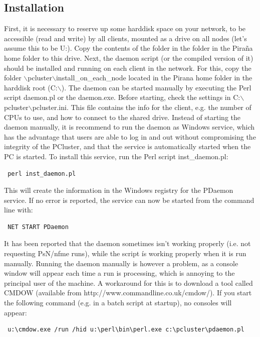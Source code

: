 \documentclass[a4,11pt]{report} \usepackage[pdftex]{graphicx}
\begin{document}
{{\subsection{Installation} First, it is necessary to reserve up some
harddisk space on your network, to be accessible (read and write) by
all clients, mounted as a drive on all nodes (let's assume this to be
U:). Copy the contents of the folder
 \normalfont in the
 \normalfont folder in the Pira\~na home folder to
this drive. Next, the daemon script (or the compiled version of it) should be
installed and running on each client in the network. For this, copy
the folder $\backslash$pcluster$\backslash$install\_on\_each\_node located in the Pirana home folder in the
harddisk root (C:$\backslash$). The daemon can be started manually by
executing the Perl script daemon.pl or the daemon.exe.  Before
starting, check the settings in
C:$\backslash$pcluster$\backslash$pcluster.ini. This file contains the
info for the client, e.g. the number of CPUs to use, and how to
connect to the shared drive.  Instead of starting the daemon manually, it is recommend to run the daemon as Windows service, which has the advantage that users are able to log in and out without compromising the integrity of the PCluster, and that
the service is automatically started when the PC is started. To
install this service, run the Perl script inst\_daemon.pl:
\begin{verbatim} perl inst_daemon.pl
\end{verbatim} This will create the information in the Windows
registry for the PDaemon service. If no error is reported, the service
can now be started from the command line with:
\begin{verbatim} NET START PDaemon
\end{verbatim}

It has been reported that the daemon sometimes isn't working properly
(i.e. not requesting PsN/nfme runs), while the script \'is working
properly when it is run manually. Running the daemon manually is
however a problem, as a console window will appear each time a run is
processing, which is annoying to the principal user of the machine. A
workaround for this is to download a tool called CMDOW (available from
http://www.commandline.co.uk/cmdow/). If you start the following
command (e.g. in a batch script at startup), no consoles will appear:
\begin{verbatim} u:\cmdow.exe /run /hid u:\perl\bin\perl.exe c:\pcluster\pdaemon.pl
\end{verbatim}

}}
\end{document}
